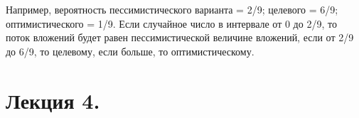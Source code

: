 \documentclass[reqno]{article}
\theoremstyle{definition}
\theoremstyle{definition}
\theoremstyle{definition}
\theoremstyle{definition}
\theoremstyle{definition}
\theoremstyle{definition}
\theoremstyle{definition}
\theoremstyle{definition}
\theoremstyle{definition}
\begin{document}
	Например, вероятность пессимистического варианта = 2/9; целевого = 6/9; оптимистического = 1/9. Если случайное число в интервале от 0 до 2/9, то поток вложений будет равен пессимистической величине вложений, если от 2/9 до 6/9, то целевому, если больше, то оптимистическому.
	
	
	
	
	\newpage
	\section{Лекция 4.}
	
	
\end{document}
